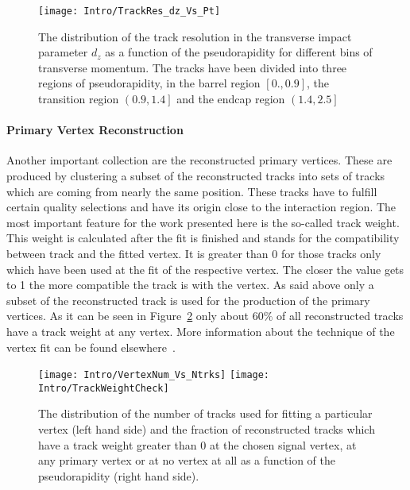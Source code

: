 \begin{figure}[!Hhtb]
    \centering
    \texttt{[image: Intro/TrackRes\_dz\_Vs\_Pt]}
    \caption[Track resolution \vs pseudo rapidity for different bins of transverse momentum]{The distribution of the track resolution in the transverse impact parameter $d_{z}$ as a function of the pseudorapidity for different bins of transverse momentum. The tracks have been divided into three regions of pseudorapidity, in the barrel region $\left[0., 0.9\right]$, the transition region $\left(0.9, 1.4\right]$ and the endcap region $\left(1.4, 2.5\right]$\label{plot:IntroTrackRes}}
\end{figure}

\paragraph{Primary Vertex Reconstruction}

Another important collection are the reconstructed primary vertices. These are produced by clustering a subset of the reconstructed tracks into sets of tracks which are coming from nearly the same position. These tracks have to fulfill certain quality selections and have its origin close to the interaction region. The most important feature for the work presented here is the so-called track weight. This weight is calculated after the fit is finished and stands for the compatibility between track and the fitted vertex. It is greater than 0 for those tracks only which have been used at the fit of the respective vertex. The closer the value gets to 1 the more compatible the track is with the vertex. As said above only a subset of the reconstructed track is used for the production of the primary vertices. As it can be seen in Figure~\ref{plot:IntroTrackWeight} only about $60\%$ of all reconstructed tracks have a track weight at any vertex.  More information about the technique of the vertex fit can be found elsewhere~\cite{CMS-PAPER-TRK-11-001}.

\begin{figure}[!Hhtb]
    \centering
    \texttt{[image: Intro/VertexNum\_Vs\_Ntrks]}
    \texttt{[image: Intro/TrackWeightCheck]}
    \caption[Distribution of number of tracks used for fitting the vertices and fraction of reconstructed tracks which have a track weight at any primary vertex]{The distribution of the number of tracks used for fitting a particular vertex (left hand side) and the fraction of reconstructed tracks which have a track weight greater than 0 at the chosen signal vertex, at any primary vertex or at no vertex at all as a function of the pseudorapidity (right hand side). \label{plot:IntroTrackWeight}}
\end{figure}

